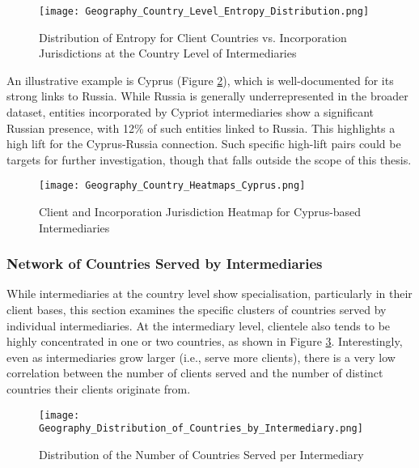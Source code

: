 \begin{figure}[htbp]
    \centering
    \texttt{[image: Geography\_Country\_Level\_Entropy\_Distribution.png]}
    \caption{Distribution of Entropy for Client Countries vs. Incorporation Jurisdictions at the Country Level of Intermediaries}
    \label{fig:geography_country_level_entropy_distribution}
\end{figure}

An illustrative example is Cyprus (Figure \ref{fig:geography_country_heatmaps_cyprus}), which is well-documented for its strong links to Russia. While Russia is generally underrepresented in the broader dataset, entities incorporated by Cypriot intermediaries show a significant Russian presence, with 12\% of such entities linked to Russia. This highlights a high lift for the Cyprus-Russia connection. Such specific high-lift pairs could be targets for further investigation, though that falls outside the scope of this thesis.

\begin{figure}[htbp]
    \centering
    \texttt{[image: Geography\_Country\_Heatmaps\_Cyprus.png]}
    \caption{Client and Incorporation Jurisdiction Heatmap for Cyprus-based Intermediaries}
    \label{fig:geography_country_heatmaps_cyprus}
\end{figure}

\subsubsection{Network of Countries Served by Intermediaries}
While intermediaries at the country level show specialisation, particularly in their client bases, this section examines the specific clusters of countries served by individual intermediaries. At the intermediary level, clientele also tends to be highly concentrated in one or two countries, as shown in Figure \ref{fig:geography_distribution_countries_by_intermediary}. Interestingly, even as intermediaries grow larger (i.e., serve more clients), there is a very low correlation between the number of clients served and the number of distinct countries their clients originate from.

\begin{figure}[htbp]
    \centering
    \texttt{[image: Geography\_Distribution\_of\_Countries\_by\_Intermediary.png]}
    \caption{Distribution of the Number of Countries Served per Intermediary}
    \label{fig:geography_distribution_countries_by_intermediary}
\end{figure}

